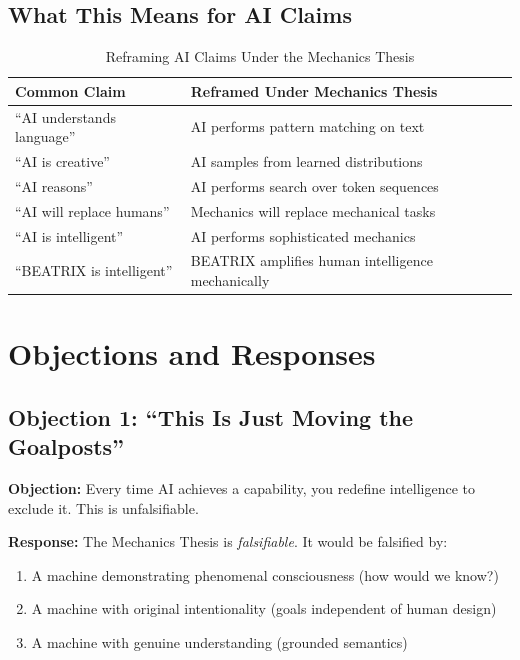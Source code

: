 \subsection{What This Means for AI Claims}

\begin{table}[htbp]
\centering
\caption{Reframing AI Claims Under the Mechanics Thesis}
\renewcommand{\arraystretch}{1.4}
\begin{tabular}{@{}p{5cm}p{7cm}@{}}
\toprule
\textbf{Common Claim} & \textbf{Reframed Under Mechanics Thesis} \\
\midrule
``AI understands language'' & AI performs pattern matching on text \\
``AI is creative'' & AI samples from learned distributions \\
``AI reasons'' & AI performs search over token sequences \\
``AI will replace humans'' & Mechanics will replace mechanical tasks \\
``AI is intelligent'' & AI performs sophisticated mechanics \\
\midrule
``BEATRIX is intelligent'' & BEATRIX amplifies human intelligence mechanically \\
\bottomrule
\end{tabular}
\end{table}


\section{Objections and Responses}
\label{sec:hi-objections}

\subsection{Objection 1: ``This Is Just Moving the Goalposts''}

\textbf{Objection:} Every time AI achieves a capability, you redefine intelligence to exclude it. This is unfalsifiable.

\textbf{Response:} The Mechanics Thesis is \textit{falsifiable}. It would be falsified by:
\begin{enumerate}
    \item A machine demonstrating phenomenal consciousness (how would we know?)
    \item A machine with original intentionality (goals independent of human design)
    \item A machine with genuine understanding (grounded semantics)
\end{enumerate}

